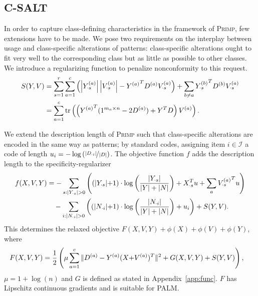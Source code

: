 \subsection{C-SALT}\label{sec:CSalt}
In order to capture class-defining characteristics in the framework of \textsc{Primp}, few extensions have to be made.
We pose two requirements on the interplay between usage and class-specific alterations of patterns: class-specific alterations ought to fit very well to the corresponding class but as little as possible to other classes.
We introduce a regularizing function to penalize nonconformity to this request.
\begin{align*}
S(Y,V) &= \sum_{s=1}^r\sum_{a=1}^c \left(\left|Y^{(a)}_{\cdot s}\right|\left|V^{(a)}_{\cdot s}\right|-{Y^{(a)}}^TD^{(a)} V^{(a)}_{\cdot s}\right)+\sum_{b\neq a}{Y^{(b)}_{\cdot s}}^TD^{(b)}V^{(a)}_{\cdot s}\\
&=\sum_{a=1}^c\operatorname*{tr}\left(\left({Y^{(a)}}^T(1^{m_a\times n}-2D^{(a)}) + Y^TD\right)V^{(a)}\right).
\end{align*}

We extend the description length of \textsc{Primp} such that class-specific alterations are encoded in the same way as patterns; by standard codes, assigning item $i\in\mathcal{I}$ a code of length $u_i=-\log\left(\nicefrac{|D_{\cdot i}|}{|D|}\right)$. The objective function $f$ adds the description length to the specificity-regularizer
\begin{align*}
f(X,V,Y)&=
-\sum_{s:|Y_{\cdot s}|> 0} \left((|Y_{\cdot s}|{+}1) \cdot \log\left(\frac{|Y_{\cdot s}|}{|Y|+|N|}\right) +X_{\cdot s}^Tu+\sum_{a}{\Va_{\cdot s}}^Tu\right)\\
&\quad -\sum_{i:|N_{\cdot i}|> 0} \left((|N_{\cdot i}|{+}1) \cdot \log\left(\frac{|N_{\cdot i}|}{|Y|+|N|}\right) +u_i\right)
+S(Y,V).
\end{align*}
This determines the relaxed objective $F(X,V,Y) +\phi(X) +\phi(V)+\phi(Y)$, where
\begin{align*}
F(X,V,Y)&= \frac{1}{2}\left(\mu\sum_{a=1}^c\|D^{(a)}-Y^{(a)}(X{+}V^{(a)})^T\|^2
+ G(X,V,Y)
+S(Y,V)\right),
\end{align*}
$\mu=1+\log(n)$ and $G$ is defined as stated in  Appendix~\ref{app:func}.
$F$ has Lipschitz continuous gradients and is suitable for PALM.

